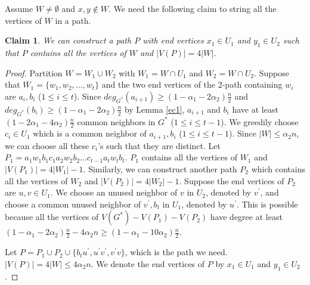 \documentclass[11pt]{article}
\newtheorem{claim}[lemma]{Claim}
\begin{document}
Assume $W\not =\emptyset$ and $x,y\not \in W$. We need the following claim to string all the vertices of $W$ in a path.

\begin{claim}\label{ec1c}
We can construct a path $P$ with end vertices $x_1\in U_1$ and $y_1\in U_2$ such that $P$ contains all the vertices of $W$ and $|V(P)|=4|W|$.
\end{claim}

\begin{proof}
Partition $W=W_1\cup W_2$ with $W_1=W\cap U_1$ and $W_2=W\cap U_2$. Suppose that $W_1=\{w_1,w_2,...,w_t\}$ and the two end vertices of the 2-path containing $w_i$ are $a_i,b_i$ ($1\leq i\leq t$). Since $deg_{G^*}(a_{i+1})\geq (1-\alpha_1-2\alpha_2)\frac{n}{2}$ and $deg_{G^*}(b_i)\geq (1-\alpha_1-2\alpha_2)\frac{n}{2}$ by Lemma \ref{ec1}, $a_{i+1}$ and $b_i$ have at least $(1-2\alpha_1-4\alpha_2)\frac{n}{2}$ common neighbors in $G^*$ ($1\leq i\leq t-1$). We greedily choose $c_i\in U_1$ which is a common neighbor of $a_{i+1},b_i$ ($1\leq i\leq t-1$). Since $|W|\leq \alpha_2 n$, we can choose all these $c_i$'s such that they are distinct. Let $P_1=a_1w_1b_1c_1a_2w_2b_2...c_{t-1}a_tw_tb_t$. $P_1$ contains all the vertices of $W_1$ and $|V(P_1)|=4|W_1|-1$. Similarly, we can construct another path $P_2$ which contains all the vertices of $W_2$ and $|V(P_2)|=4|W_2|-1$. Suppose the end vertices of $P_2$ are $u,v\in U_1$. We choose an unused neighbor of $v$ in $U_2$, denoted by $v^{'}$, and choose a common unused neighbor of $v^{'}, b_t$ in $U_1$, denoted by $u^{'}$. This is possible because all the vertices of $V(G^*)-V(P_1)-V(P_2)$ have degree at least $(1-\alpha_1-2\alpha_2)\frac{n}{2}-4\alpha_2 n\geq (1-\alpha_1-10\alpha_2)\frac{n}{2}$.

Let $P=P_1\cup P_2\cup \{b_tu^{'},u^{'}v^{'},v^{'}v\}$, which is the path we need. $|V(P)|=4|W|\leq 4\alpha_2n$. We denote the end vertices of $P$ by $x_1\in U_1$ and $y_1\in U_2$.
\end{proof}
\end{document}
